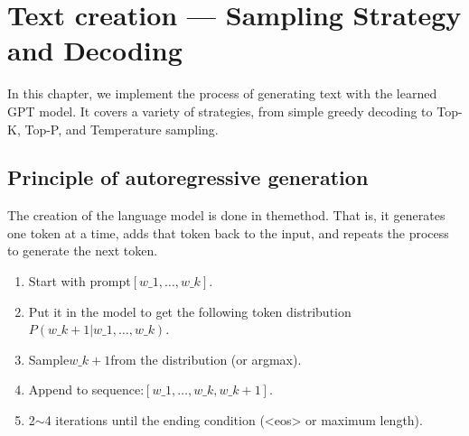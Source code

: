 \chapter{Text creation — Sampling Strategy and Decoding}
\label{ch:generation}

In this chapter, we implement the process of generating text with the learned GPT model. It covers a variety of strategies, from simple greedy decoding to Top-K, Top-P, and Temperature sampling.

\section{Principle of autoregressive generation}

The creation of the language model is done in themethod. That is, it generates one token at a time, adds that token back to the input, and repeats the process to generate the next token.

\begin{enumerate}
\item Start with prompt$[w\_1, \dots, w\_k]$.
\item Put it in the model to get the following token distribution$P(w\_{k+1} | w\_1, \dots, w\_k)$.
\item Sample$w\_{k+1}$from the distribution (or argmax).
\item Append to sequence:$[w\_1, \dots, w\_k, w\_{k+1}]$.
\item 2$\sim$4 iterations until the ending condition (<eos> or maximum length).
\end{enumerate}

